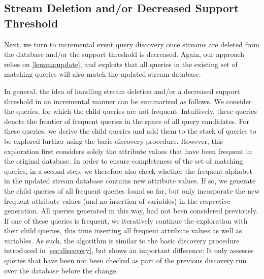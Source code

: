 \subsection{Stream Deletion and/or Decreased Support Threshold}
\label{sec:delete_decrease}

Next, we turn to incremental event query discovery once
streams are deleted from the database and/or the support
threshold is decreased. Again, our approach relies on
\autoref{lemma:update}, and exploits that all queries in
the existing set of matching queries will
also match the updated stream database.

In general, the idea of handling stream deletion and/or a decreased support
threshold in an incremental manner can be summarized as follows.
We consider the queries, for which the child queries are not frequent.
Intuitively, these queries denote the frontier of frequent queries in the
space of all query candidates. For these queries, we derive the child
queries and add them to the stack of queries to be explored further using
the basic discovery procedure. However, this exploration first considers
solely the attribute values that have been frequent in the original
database. In order to ensure completeness of the set of matching queries, in
a second step, we therefore also check whether the frequent alphabet in the
updated stream database contains new attribute values. If so, we generate
the child queries of all frequent queries found so far, but only incorporate
the new frequent attribute values (and no insertion of variables) in the
respective generation. All queries generated in this way, had not
been considered previously. If one of these queries is frequent, we
iteratively continue the exploration with their child queries, this 
time inserting all frequent attribute values as well as variables.
As such, the algorithm is similar to the basic discovery procedure
introduced in \autoref{sec:discovery}, but shows an important difference: It
only assesses queries that have been not been checked as part of the
previous discovery run over the database before the change.





